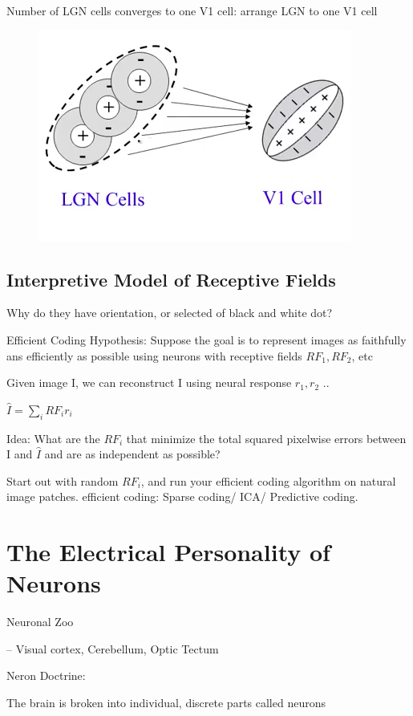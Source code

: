 \documentclass{book}
\begin{document}
Number of LGN cells converges to one V1 cell: arrange LGN to one V1 cell

\begin{figure}[h]
\centering
\includegraphics[width=0.7\linewidth]{figures/V1Cell}
\caption{}
\label{fig:v1cell}
\end{figure}

\subsection{Interpretive Model of Receptive Fields}

Why do they have orientation, or selected of black and white dot?

Efficient Coding Hypothesis: Suppose the goal is to represent images as faithfully ans efficiently as possible using neurons with receptive fields $RF_1,RF_2$, etc 

Given image I, we can reconstruct I using neural response $r_1,r_2$ ..

$ \hat{I} = \sum_{i} RF_i r_i$

Idea: What are the $RF_i$ that minimize the total squared pixelwise errors between I and $\hat{I}$ and are as independent as possible?


Start out with random $RF_i$, and run your efficient coding algorithm on natural image patches. efficient coding: Sparse coding/ ICA/ Predictive coding.



\section{The Electrical Personality of Neurons}
Neuronal Zoo

-- Visual cortex, Cerebellum, Optic Tectum

Neron Doctrine: 

The brain is broken into individual, discrete parts called neurons
\end{document}
